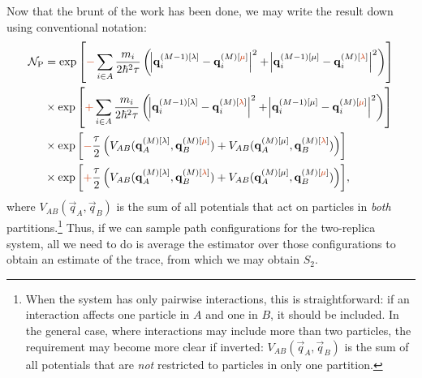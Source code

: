 Now that the brunt of the work has been done, we may write the result down using conventional notation:
\begin{align}
	\mathcal{N}_\mathrm{P}
	&=
	\expb{\red{-}\sum_{i \in A} \frac{m_i}{2 \hbar^2 \tau} \left(
			\abs{\vec{q}_i\beadsys{M-1}{\lambda} - \vec{q}_i\beadsys{M}{\red{\mu}}}^2
			+ \abs{\vec{q}_i\beadsys{M-1}{\mu} - \vec{q}_i\beadsys{M}{\red{\lambda}}}^2
		\right)} \notag \\
	&\times
	\expb{\red{+} \sum_{i \in A} \frac{m_i}{2 \hbar^2 \tau} \left(
			\abs{\vec{q}_i\beadsys{M-1}{\lambda} - \vec{q}_i\beadsys{M}{\red{\lambda}}}^2
			+ \abs{\vec{q}_i\beadsys{M-1}{\mu} - \vec{q}_i\beadsys{M}{\red{\mu}}}^2
		\right)} \notag \\
	&\times
	\expb{\red{-}\frac{\tau}{2} \left(
			V_{AB}(\vec{q}_A\beadsys{M}{\lambda}, \vec{q}_B\beadsys{M}{\red{\mu}})
			+ V_{AB}(\vec{q}_A\beadsys{M}{\mu}, \vec{q}_B\beadsys{M}{\red{\lambda}})
		\right)} \notag \\
	&\times
	\expb{\red{+} \frac{\tau}{2} \left(
			V_{AB}(\vec{q}_A\beadsys{M}{\lambda}, \vec{q}_B\beadsys{M}{\red{\lambda}})
			+ V_{AB}(\vec{q}_A\beadsys{M}{\mu}, \vec{q}_B\beadsys{M}{\red{\mu}})
		\right)},
\end{align}
where $V_{AB}(\vec{q}_A, \vec{q}_B)$ is the sum of all potentials that act on particles in \emph{both} partitions.\footnote{
	When the system has only pairwise interactions, this is straightforward: if an interaction affects one particle in $A$ and one in $B$, it should be included.
	In the general case, where interactions may include more than two particles, the requirement may become more clear if inverted: $V_{AB}(\vec{q}_A, \vec{q}_B)$ is the sum of all potentials that are \emph{not} restricted to particles in only one partition.
}
Thus, if we can sample path configurations for the two-replica system, all we need to do is average the estimator over those configurations to obtain an estimate of the trace, from which we may obtain $S_2$.

